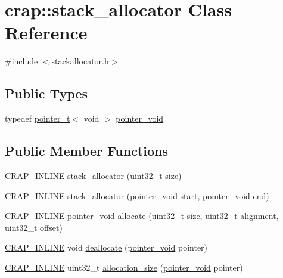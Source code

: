 \hypertarget{classcrap_1_1stack__allocator}{\section{crap\+:\+:stack\+\_\+allocator Class Reference}
\label{classcrap_1_1stack__allocator}
}


{\ttfamily \#include $<$stackallocator.\+h$>$}

\subsection*{Public Types}
\begin{DoxyCompactItemize}
\item 
typedef \hyperlink{structcrap_1_1pointer__t}{pointer\+\_\+t}$<$ void $>$ \hyperlink{classcrap_1_1stack__allocator_a1595531e9229285629d99f036ebac325}{pointer\+\_\+void}
\end{DoxyCompactItemize}
\subsection*{Public Member Functions}
\begin{DoxyCompactItemize}
\item 
\hyperlink{config__x86_8h_a5a40526b8d842e7ff731509998bb0f1c}{C\+R\+A\+P\+\_\+\+I\+N\+L\+I\+N\+E} \hyperlink{classcrap_1_1stack__allocator_a91f7e72d7f669e0a25e53f14e2bf0e7e}{stack\+\_\+allocator} (uint32\+\_\+t size)
\item 
\hyperlink{config__x86_8h_a5a40526b8d842e7ff731509998bb0f1c}{C\+R\+A\+P\+\_\+\+I\+N\+L\+I\+N\+E} \hyperlink{classcrap_1_1stack__allocator_a9cafd8ae3316558ca6f1b68ed32bce47}{stack\+\_\+allocator} (\hyperlink{classcrap_1_1stack__allocator_a1595531e9229285629d99f036ebac325}{pointer\+\_\+void} start, \hyperlink{classcrap_1_1stack__allocator_a1595531e9229285629d99f036ebac325}{pointer\+\_\+void} end)
\item 
\hyperlink{config__x86_8h_a5a40526b8d842e7ff731509998bb0f1c}{C\+R\+A\+P\+\_\+\+I\+N\+L\+I\+N\+E} \hyperlink{classcrap_1_1stack__allocator_a1595531e9229285629d99f036ebac325}{pointer\+\_\+void} \hyperlink{classcrap_1_1stack__allocator_ab46f56492271335abc2a29c3f0ce05af}{allocate} (uint32\+\_\+t size, uint32\+\_\+t alignment, uint32\+\_\+t offset)
\item 
\hyperlink{config__x86_8h_a5a40526b8d842e7ff731509998bb0f1c}{C\+R\+A\+P\+\_\+\+I\+N\+L\+I\+N\+E} void \hyperlink{classcrap_1_1stack__allocator_a9489281da591e65d9a331c2ff2deaa11}{deallocate} (\hyperlink{classcrap_1_1stack__allocator_a1595531e9229285629d99f036ebac325}{pointer\+\_\+void} pointer)
\item 
\hyperlink{config__x86_8h_a5a40526b8d842e7ff731509998bb0f1c}{C\+R\+A\+P\+\_\+\+I\+N\+L\+I\+N\+E} uint32\+\_\+t \hyperlink{classcrap_1_1stack__allocator_adedeab58b056fc17740b11149083a290}{allocation\+\_\+size} (\hyperlink{classcrap_1_1stack__allocator_a1595531e9229285629d99f036ebac325}{pointer\+\_\+void} pointer)
\end{DoxyCompactItemize}



